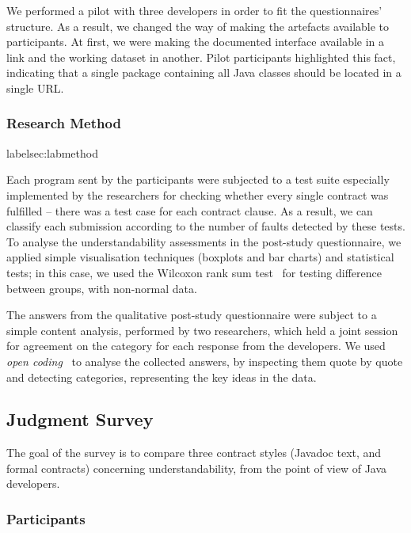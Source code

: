 We performed a pilot with three developers in order to fit the questionnaires' structure.
As a result, we changed the way of making the artefacts available to participants. 
At first, we were making the documented interface available in a link and the working dataset in another. 
Pilot participants highlighted this fact, indicating that a single package containing all Java classes should be located in a single URL.

\subsubsection{Research Method}
label{sec:labmethod}

Each program sent by the participants were subjected to a test suite especially implemented by the researchers for checking whether every single contract was fulfilled -- there was a test case for each contract clause.
As a result, we can classify each submission according to the number of faults detected by these tests.
To analyse the understandability assessments in the post-study questionnaire, we applied simple visualisation techniques (boxplots and bar charts) and statistical tests; in this case, we used the Wilcoxon rank sum test~\cite{statistical} for testing difference between groups, with non-normal data.

The answers from the qualitative post-study questionnaire were subject to a simple content analysis, performed by two researchers, which held a joint session for agreement on the category for each response from the developers. 
 We used \emph{open coding}~\cite{Price2010} to analyse the collected answers, by inspecting them quote by quote and detecting categories, representing the key ideas in the data.




\subsection{Judgment Survey}
\label{sec:survey}

The goal of the survey is to compare three contract styles (Javadoc text, \contractjdoc{} and formal contracts) concerning understandability, from the point of view of Java developers. 

\subsubsection{Participants}
\label{sec:surveyPart}

